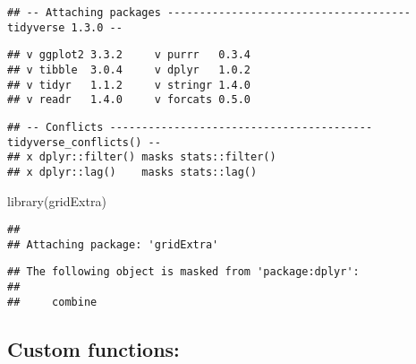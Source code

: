 \documentclass[
]{article}
\newenvironment{Shaded}{\begin{snugshade}}{\end{snugshade}}
\newcommand{\FunctionTok}[1]{\textcolor[rgb]{0.00,0.00,0.00}{#1}}
\newcommand{\NormalTok}[1]{#1}
\begin{document}
\begin{verbatim}
## -- Attaching packages -------------------------------------- tidyverse 1.3.0 --
\end{verbatim}

\begin{verbatim}
## v ggplot2 3.3.2     v purrr   0.3.4
## v tibble  3.0.4     v dplyr   1.0.2
## v tidyr   1.1.2     v stringr 1.4.0
## v readr   1.4.0     v forcats 0.5.0
\end{verbatim}

\begin{verbatim}
## -- Conflicts ----------------------------------------- tidyverse_conflicts() --
## x dplyr::filter() masks stats::filter()
## x dplyr::lag()    masks stats::lag()
\end{verbatim}

\begin{Shaded}
\begin{Highlighting}[]
\FunctionTok{library}\NormalTok{(gridExtra)}
\end{Highlighting}
\end{Shaded}

\begin{verbatim}
## 
## Attaching package: 'gridExtra'
\end{verbatim}

\begin{verbatim}
## The following object is masked from 'package:dplyr':
## 
##     combine
\end{verbatim}

\hypertarget{custom-functions}{%
\subsection{Custom functions:}\label{custom-functions}}
\end{document}
